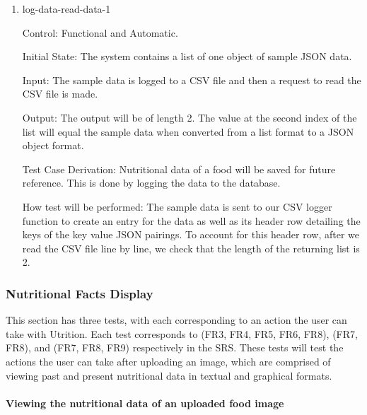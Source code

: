 \documentclass[12pt, titlepage]{article}
\begin{document}
	\begin{enumerate}
		
		\item{log-data-read-data-1\\}
		
		Control: Functional and Automatic.
		
		Initial State: The system contains a list of one object of sample JSON data.
		
		Input: The sample data is logged to a CSV file and then a request to read the CSV file is made.
		
		Output: The output will be of length 2. The value at the second index of the list will equal the sample data when converted from a list format to a JSON object format. 
		
		Test Case Derivation: Nutritional data of a food will be saved for 
		future reference. This is done by logging the data to the database.
		
		How test will be performed: The sample data is sent to our CSV logger function to create an entry for the data as well as its header row detailing the keys of the key value JSON pairings. To account for this header row, after we read the CSV file line by line, we check that the length of the returning list is 2.
		
	\end{enumerate}
	
	\subsubsection{Nutritional Facts Display}
	This section has three tests, with each corresponding to an action the user can take with Utrition. Each test corresponds to (FR3, FR4, FR5, FR6, FR8), (FR7, FR8), and (FR7, FR8, FR9) respectively in the SRS. These tests will test the actions the user can take after uploading an image, which are comprised of viewing past and present nutritional data in textual and graphical formats.
	
	
	
	\paragraph{Viewing the nutritional data of an uploaded food image}
	
\end{document}
